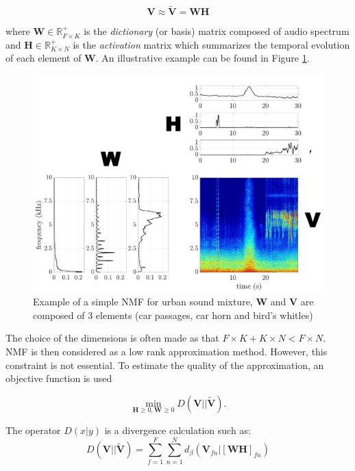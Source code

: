 \documentclass[twocolumn,a4paper,10pt]{article}
\begin{document}
\begin{equation}\label{eq:nmf}
\mathbf{V} \approx \mathbf{\tilde{V}} = \mathbf{WH}
\end{equation}

where $\mathbf{W} \in \mathbb{R}^+_{F \times K}$ is the \textit{dictionary} (or basis) matrix composed of audio spectrum and $\mathbf{H} \in \mathbb{R}^+_{K \times N}$ is the \textit{activation} matrix which summarizes the temporal evolution of each element of $\mathbf{W}$. An illustrative example can be found in Figure  \ref{fig:example_NMF}.

\begin{figure}[t]
\centering
\includegraphics[width=0.9\linewidth]{figures/schema_introduction_nmf.pdf}
\caption{Example of a simple NMF  for urban sound mixture, $\mathbf{W}$ and $\mathbf{V}$ are composed of 3 elements (car passages, car horn and bird's whitles)}
\label{fig:example_NMF}
\end{figure}

The choice of the dimensions is often made as that $F\times K + K \times N < F \times N$. NMF is then considered as a low rank approximation method. However, this constraint is not essential. To estimate the quality of the approximation, an objective function is used

\begin{equation}\label{eq:min-D-WH}
\underset{\mathbf{H} \geq 0, \mathbf{W} \geq 0}{\min} D\left(\mathbf{V} \vert \vert \mathbf{\tilde{V}}\right).
\end{equation}

The operator $D(x\vert y)$ is a divergence calculation such as:
\begin{equation}
D\left(\textbf{V} \vert\vert \mathbf{\tilde{V}} \right) = \sum_{f = 1}^{F} \sum_{n = 1}^{N} d_{\beta}
\left(\textbf{V}_{fn} \vert \left[ \textbf{WH} \right]_{fn} \right)
\end{equation}
\end{document}
